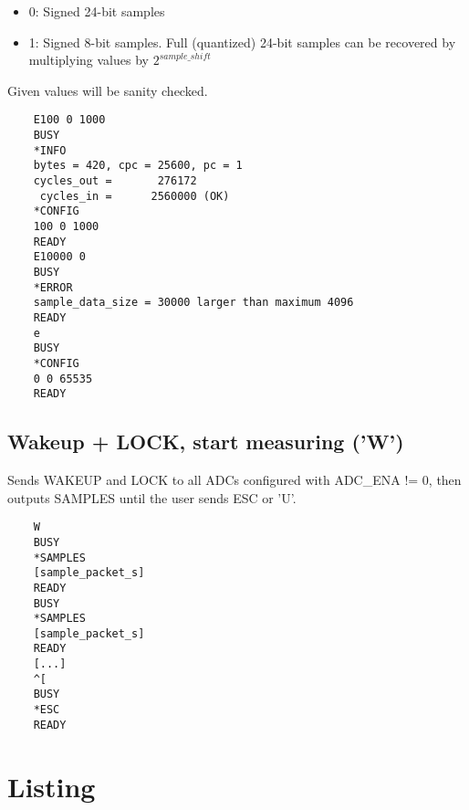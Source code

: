 \documentclass{article}
\begin{document}
\begin{itemize}
\item 0: Signed 24-bit samples
\item 1: Signed 8-bit samples. Full (quantized) 24-bit samples can be recovered by multiplying values by $2^{sample\_shift}$
\end{itemize}

Given values will be sanity checked.

\begin{lstlisting}
    E100 0 1000
    BUSY
    *INFO
    bytes = 420, cpc = 25600, pc = 1
    cycles_out =       276172
     cycles_in =      2560000 (OK)
    *CONFIG
    100 0 1000
    READY
    E10000 0
    BUSY
    *ERROR
    sample_data_size = 30000 larger than maximum 4096
    READY
    e
    BUSY
    *CONFIG
    0 0 65535
    READY
\end{lstlisting}


\subsection{Wakeup + LOCK, start measuring ('W')}

Sends WAKEUP and LOCK to all ADCs configured with ADC\_ENA != 0,
then outputs SAMPLES until the user sends ESC or 'U'.

\begin{lstlisting}
    W
    BUSY
    *SAMPLES
    [sample_packet_s]
    READY
    BUSY
    *SAMPLES
    [sample_packet_s]
    READY
    [...]
    ^[
    BUSY
    *ESC
    READY
\end{lstlisting}

\newpage
\section{Listing}
\label{sample_packet_s}


\end{document}
